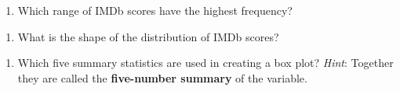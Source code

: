 \documentclass[
]{report}
\providecommand{\tightlist}{%
  \setlength{\itemsep}{0pt}\setlength{\parskip}{0pt}}
\begin{document}
\vspace{1in}

\begin{enumerate}
\def\labelenumi{\arabic{enumi}.}
\setcounter{enumi}{8}
\tightlist
\item
  Which range of IMDb scores have the highest frequency?
\end{enumerate}

\vspace{0.4in}

\begin{enumerate}
\def\labelenumi{\arabic{enumi}.}
\setcounter{enumi}{9}
\tightlist
\item
  What is the shape of the distribution of IMDb scores?
\end{enumerate}

\vspace{0.4in}

\begin{enumerate}
\def\labelenumi{\arabic{enumi}.}
\setcounter{enumi}{10}
\tightlist
\item
  Which five summary statistics are used in creating a box plot? \emph{Hint}: Together they are called the \textbf{five-number summary} of the variable.
\end{enumerate}

\vspace{0.4in}
\end{document}
